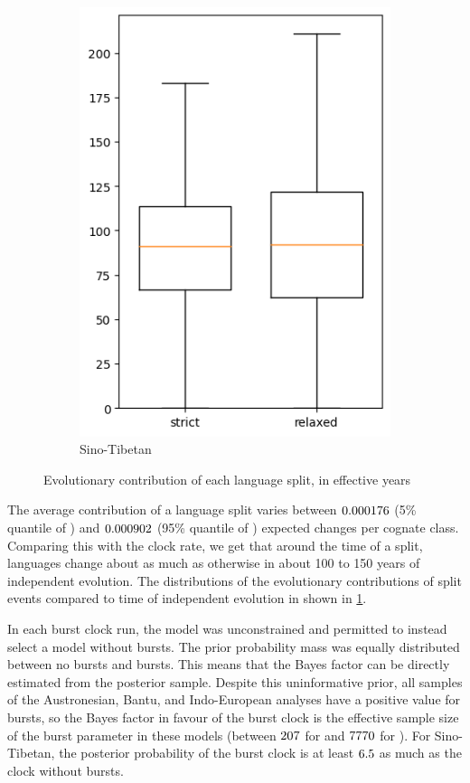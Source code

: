 \documentclass[]{rsos}%
\begin{document}
\begin{figure}
\begin{subfigure}{0.4\textwidth}
    \includegraphics[width=\textwidth]{supplement/analysis/sinotibetan_years_per_split.png}
    \caption{Sino-Tibetan}
  \end{subfigure}
  \caption{Evolutionary contribution of each language split, in effective years}
  \label{f:peryear}
\end{figure}


The average contribution of a language split varies between $0.000176$ (5\%
quantile of \minn) and $0.000902$ (95\% quantile of \maxn)
expected changes per cognate class. Comparing this with the clock rate, we get
that around the time of a split, languages change about as much as otherwise in
about 100 to 150 years of independent evolution. The distributions of the
evolutionary contributions of split events compared to time of independent
evolution in shown in \cref{f:peryear}.

In each burst clock run, the model was unconstrained and permitted to instead
select a model without bursts. The prior probability mass was equally distributed
between no bursts and bursts. This means that the Bayes factor can be directly estimated from the posterior sample.
Despite this uninformative prior, all samples of the
Austronesian, Bantu, and Indo-European analyses have a positive value for bursts,
so the Bayes factor in favour of the burst clock is the effective sample size of
the burst parameter in these models (between $207$ for \minessn{} and
$7770$ for \maxessn{}). For Sino-Tibetan,
the posterior probability of the burst clock is at least $6.5$ as much as the clock
without bursts.
\end{document}
